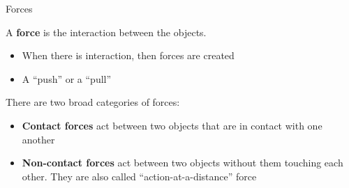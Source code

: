 \documentclass[12pt,compress,aspectratio=169]{beamer}
\begin{document}
%  



\begin{frame}{Forces}

  A \textbf{force} is the interaction between the objects.
  \begin{itemize}
  \item When there is interaction, then forces are created
  \item A ``push'' or a ``pull''
  \end{itemize}

  There are two broad categories of forces:
  \begin{itemize}
  \item\textbf{Contact forces} act between two objects that are in contact
    with one another
  \item\textbf{Non-contact forces} act between two objects without them
    touching each other. They are also called ``action-at-a-distance'' force
  \end{itemize}
\end{frame}
\end{document}
